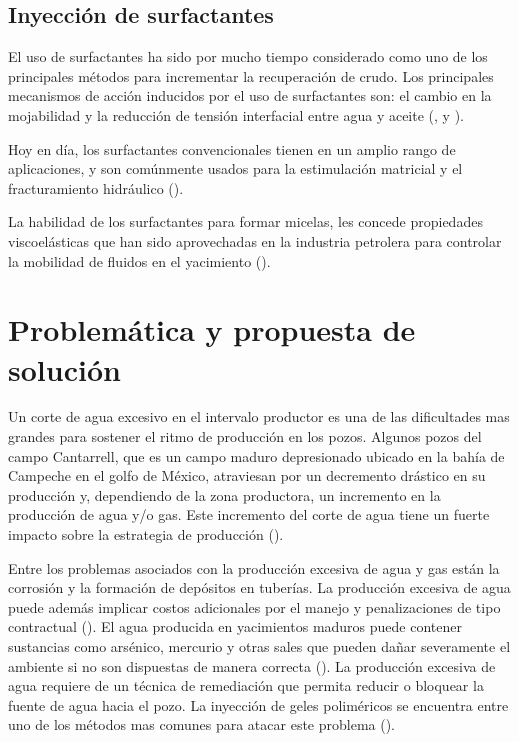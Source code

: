 \subsection{Inyección de surfactantes}

El uso de surfactantes ha sido por mucho tiempo considerado como uno de los principales métodos para incrementar la recuperación de crudo. Los principales mecanismos de acción inducidos por el uso de surfactantes son: el cambio en la mojabilidad y la reducción de tensión interfacial entre agua y aceite (\cite{Austad1998}, \cite{Hirasaki2004} y \cite{Standnes2000}).

Hoy en día, los surfactantes convencionales tienen en un amplio rango de aplicaciones, y son comúnmente usados para la estimulación matricial y el fracturamiento hidráulico (\cite{Sullivan2006}).

La habilidad de los surfactantes para formar micelas, les concede propiedades viscoelásticas que han sido aprovechadas en la industria petrolera para controlar la mobilidad de fluidos en el yacimiento (\cite{LaastreBuelvas2012}).

\section{Problemática y propuesta de solución}

Un corte de agua excesivo en el intervalo productor es una de las dificultades mas grandes para sostener el ritmo de producción en los pozos. Algunos pozos del campo Cantarrell, que es un campo maduro depresionado ubicado en la bahía de Campeche en el golfo de México, atraviesan por un decremento drástico en su producción y, dependiendo de la zona productora, un incremento en la producción de agua y/o gas. Este incremento del corte de agua tiene un fuerte impacto sobre la estrategia de producción (\cite{Lopez2014}).

Entre los problemas asociados con la producción excesiva de agua y gas están la corrosión y la formación de depósitos en tuberías. La producción excesiva de agua puede además implicar costos adicionales por el manejo y penalizaciones de tipo contractual (\cite{Bailey2000}). El agua producida en yacimientos maduros puede contener sustancias como arsénico, mercurio y otras sales que pueden dañar severamente el ambiente si no son dispuestas de manera correcta (\cite{Hibbeler2005}). La producción excesiva de agua requiere de un técnica de remediación que permita reducir o bloquear la fuente de agua hacia el pozo. La inyección de geles poliméricos se encuentra entre uno de los métodos mas comunes para atacar este problema (\cite{ElKarsani2015}).

